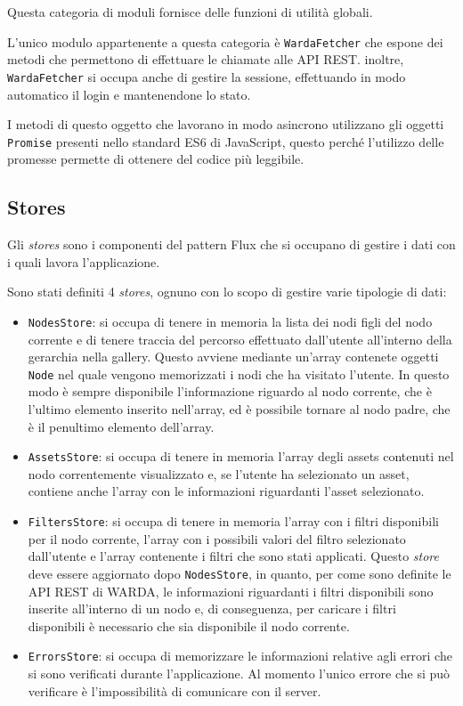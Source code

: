 Questa categoria di moduli fornisce delle funzioni di utilità globali.

L'unico modulo appartenente a questa categoria è \texttt{WardaFetcher} che espone dei metodi che permettono di effettuare le chiamate alle API REST.
inoltre, \texttt{WardaFetcher} si occupa anche di gestire la sessione, effettuando in modo automatico il login e mantenendone lo stato.

I metodi di questo oggetto che lavorano in modo asincrono utilizzano gli oggetti \texttt{Promise} presenti nello standard ES6 di JavaScript, questo perché l'utilizzo delle promesse permette di ottenere del codice più leggibile.

\subsection{Stores}

Gli \textit{stores} sono i componenti del pattern Flux che si occupano di gestire i dati con i quali lavora l'applicazione. 

Sono stati definiti 4 \textit{stores}, ognuno con lo scopo di gestire varie tipologie di dati:
\begin{itemize}
\item \texttt{NodesStore}: si occupa di tenere in memoria la lista dei nodi figli del nodo corrente e di tenere traccia del percorso effettuato dall'utente all'interno della gerarchia nella gallery. Questo avviene mediante un'array contenete oggetti \texttt{Node} nel quale vengono memorizzati i nodi che ha visitato l'utente. In questo modo è sempre disponibile l'informazione riguardo al nodo corrente, che è l'ultimo elemento inserito nell'array, ed è possibile tornare al nodo padre, che è il penultimo elemento dell'array.
\item \texttt{AssetsStore}: si occupa di tenere in memoria l'array degli assets contenuti nel nodo correntemente visualizzato e, se l'utente ha selezionato un asset, contiene anche l'array con le informazioni riguardanti l'asset selezionato.
\item \texttt{FiltersStore}: si occupa di tenere in memoria l'array con i filtri disponibili per il nodo corrente, l'array con i possibili valori del filtro selezionato dall'utente e l'array contenente i filtri che sono stati applicati. Questo \textit{store} deve essere aggiornato dopo \texttt{NodesStore}, in quanto, per come sono definite le API REST di WARDA, le informazioni riguardanti i filtri disponibili sono inserite all'interno di un nodo e, di conseguenza, per caricare i filtri disponibili è necessario che sia disponibile il nodo corrente.
\item \texttt{ErrorsStore}: si occupa di memorizzare le informazioni relative agli errori che si sono verificati durante l'applicazione. Al momento l'unico errore che si può verificare è l'impossibilità di comunicare con il server.
\end{itemize}

